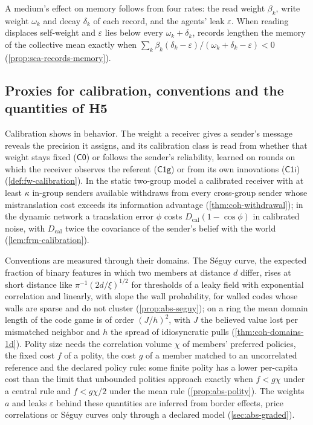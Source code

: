 A medium's effect on memory follows from four rates: the read weight $\beta_k$, write weight $\omega_k$ and decay $\delta_k$ of each record, and the agents' leak $\varepsilon$. When reading displaces self-weight and $\varepsilon$ lies below every $\omega_k+\delta_k$, records lengthen the memory of the collective mean exactly when $\sum_k\beta_k(\delta_k-\varepsilon)/(\omega_k+\delta_k-\varepsilon)<0$ (\cref{prop:sca-records-memory}).

\subsection{Proxies for calibration, conventions and the quantities of H5}\label{sup:pre-proxies-for-calibration-conventions-and}

Calibration shows in behavior. The weight a receiver gives a sender's message reveals the precision it assigns, and its calibration class is read from whether that weight stays fixed ($\mathsf{C0}$) or follows the sender's reliability, learned on rounds on which the receiver observes the referent ($\mathsf{C1g}$) or from its own innovations ($\mathsf{C1i}$) (\cref{def:fw-calibration}). In the static two-group model a calibrated receiver with at least $\kappa$ in-group senders available withdraws from every cross-group sender whose mistranslation cost exceeds its information advantage (\cref{thm:coh-withdrawal}); in the dynamic network a translation error $\phi$ costs $D_{\mathrm{cal}}(1-\cos\phi)$ in calibrated noise, with $D_{\mathrm{cal}}$ twice the covariance of the sender's belief with the world (\cref{lem:frm-calibration}).

Conventions are measured through their domains. The S\'eguy curve, the expected fraction of binary features in which two members at distance $d$ differ, rises at short distance like $\pi^{-1}(2d/\xi)^{1/2}$ for thresholds of a leaky field with exponential correlation and linearly, with slope the wall probability, for walled codes whose walls are sparse and do not cluster (\cref{prop:abs-seguy}); on a ring the mean domain length of the code game is of order $(J/h)^2$, with $J$ the believed value lost per mismatched neighbor and $h$ the spread of idiosyncratic pulls (\cref{thm:coh-domains-1d}). Polity size needs the correlation volume $\chi$ of members' preferred policies, the fixed cost $f$ of a polity, the cost $g$ of a member matched to an uncorrelated reference and the declared policy rule: some finite polity has a lower per-capita cost than the limit that unbounded polities approach exactly when $f<g\chi$ under a central rule and $f<g\chi/2$ under the mean rule (\cref{prop:abs-polity}). The weights $a$ and leaks $\varepsilon$ behind these quantities are inferred from border effects, price correlations or S\'eguy curves only through a declared model (\cref{sec:abs-graded}).

